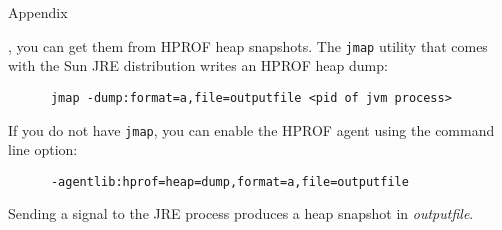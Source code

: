 Appendix

, you can get them from HPROF heap snapshots. The \texttt{jmap} utility that comes with the Sun JRE distribution writes an HPROF heap dump:
\ttfamily
\begin{verbatim} 
      jmap -dump:format=a,file=outputfile <pid of jvm process> 
\end{verbatim}
If you do not have \texttt{jmap}, you can enable the HPROF agent using the command line option: 
\ttfamily
\begin{verbatim} 
      -agentlib:hprof=heap=dump,format=a,file=outputfile
\end{verbatim}
\normalfont
Sending a signal to the JRE process produces a heap snapshot in \textit{outputfile}.


